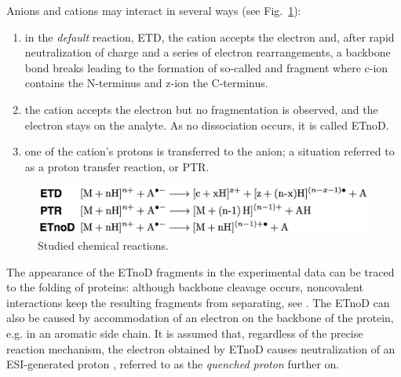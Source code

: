 \documentclass{llncs}
\begin{document}
Anions and cations may interact in several ways (see Fig.~\ref{img::reactions}):
\begin{enumerate}
        \item in the \textit{default} reaction, ETD, the cation accepts the electron and, after rapid neutralization of charge and a series of electron rearrangements, a backbone  bond breaks leading to the formation of so-called  and  fragment where c-ion contains the N-terminus and z-ion the C-terminus.

        \item the cation accepts the electron but no fragmentation is observed, and the electron stays on the analyte. As no dissociation occurs, it is called ETnoD.

        \item one of the cation’s protons is transferred to the anion; a situation referred to as a proton transfer reaction, or PTR.
\end{enumerate}
\begin{figure}[h]\centering
        \includegraphics[width=\textwidth]{reactions.png}
        \caption{Studied chemical reactions.}\label{img::reactions}
\end{figure}



The appearance of the ETnoD fragments in the experimental data can be traced to the folding of proteins: although backbone cleavage occurs, noncovalent interactions keep the resulting fragments from separating, see \cite{Lermyte2014-vu,Lermyte2015-oy}. The ETnoD can also be caused by accommodation of an electron on the backbone of the protein, e.g. in an aromatic side chain. It is assumed that, regardless of the precise reaction mechanism, the electron obtained by ETnoD causes neutralization of an ESI-generated proton \cite{Lermyte2015-lm}, referred to as the \textit{quenched proton} further on.
\end{document}
